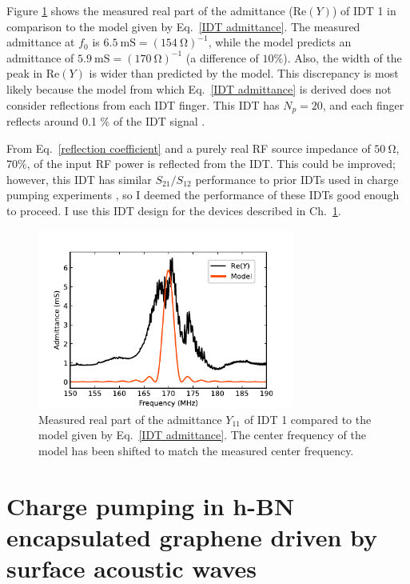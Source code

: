 \documentclass{beavtex_dub_edit}
\begin{document}
Figure \ref{Z11 plot} shows the measured real part of the admittance ($\mathrm{Re}(Y)$) of IDT 1 in comparison to the model given by Eq.\ \ref{IDT admittance}. The measured admittance at $f_0$ is $\SI{6.5}{\milli\siemens} = (\SI{154}{\ohm})^{-1}$, while the model predicts an admittance of $\SI{5.9}{\milli\siemens} = (\SI{170}{\ohm})^{-1}$ (a difference of $10\%$). Also, the width of the peak in $\mathrm{Re}(Y)$ is wider than predicted by the model. This discrepancy is most likely because the model from which Eq.\ \ref{IDT admittance} is derived does not consider reflections from each IDT finger. This IDT has $N_p = 20$, and each finger reflects around 0.1  \% of the IDT signal \cite[p.\ 140]{lane_integrating_2021}.

From Eq.\ \ref{reflection coefficient} and a purely real RF source impedance of $\SI{50}{\ohm}$, $70\%$, of the input RF power is reflected from the IDT. This could be improved; however, this IDT has similar $S_{21}/S_{12}$ performance to prior IDTs used in charge pumping experiments \cite{buitelaar_charge_2006}, so I deemed the performance of these IDTs good enough to proceed. I use this IDT design for the devices described in Ch.\ \ref{AE charge pumping paper}.

\begin{figure}
    \includegraphics[width = 0.75\textwidth]{Z11_plot_.pdf}
    \caption[Measured real part of the admittance $Y_{11}$ of IDT 1 compared to the model given by Eq.\ \ref{IDT admittance}.]{Measured real part of the admittance $Y_{11}$ of IDT 1 compared to the model given by Eq.\ \ref{IDT admittance}. The center frequency of the model has been shifted to match the measured center frequency.}
    \label{Z11 plot}
\end{figure}

\chapter[Charge pumping in h-BN encapsulated graphene driven by surface acoustic waves][Charge pumping in h-BN encapsulated graphene]{Charge pumping in h-BN encapsulated graphene driven by surface acoustic waves}\label{AE charge pumping paper}
\end{document}

